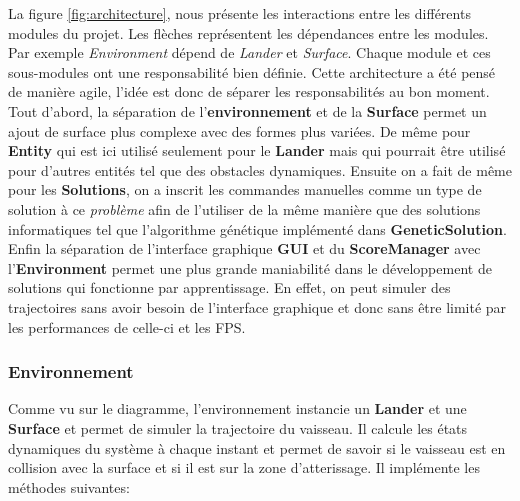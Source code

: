\documentclass[french,a4paper,10pt,twocolumn]{article}
\begin{document}
La figure \ref{fig:architecture}, nous présente les interactions entre les différents modules du projet.
Les flèches représentent les dépendances entre les modules. Par exemple \textit{Environment} dépend de \textit{Lander} et \textit{Surface}.
Chaque module et ces sous-modules ont une responsabilité bien définie.
Cette architecture a été pensé de manière agile, l'idée est donc de séparer les responsabilités au bon moment. 
Tout d'abord, la séparation de l'\textbf{environnement} et de la \textbf{Surface} permet un ajout de surface plus complexe avec des formes plus variées.
De même pour \textbf{Entity} qui est ici utilisé seulement pour le \textbf{Lander} mais qui pourrait être utilisé pour d'autres entités tel que des obstacles dynamiques.
Ensuite on a fait de même pour les \textbf{Solutions}, on a inscrit les commandes manuelles comme un type de solution à ce \textit{problème} afin de 
l'utiliser de la même manière que des solutions informatiques tel que l'algorithme génétique implémenté dans \textbf{GeneticSolution}.
Enfin la séparation de l'interface graphique \textbf{GUI} et du \textbf{ScoreManager} avec l'\textbf{Environment} permet une plus grande maniabilité dans le
développement de solutions qui fonctionne par apprentissage. En effet, on peut simuler des trajectoires sans avoir besoin de l'interface graphique et donc 
sans être limité par les performances de celle-ci et les FPS.

\subsubsection{Environnement}

Comme vu sur le diagramme, l'environnement instancie un \textbf{Lander} et une \textbf{Surface} et permet de simuler la trajectoire du vaisseau.
Il calcule les états dynamiques du système à chaque instant et permet de savoir si le vaisseau est en collision avec la surface et si il est sur la zone d'atterissage. 
Il implémente les méthodes suivantes:
\end{document}
